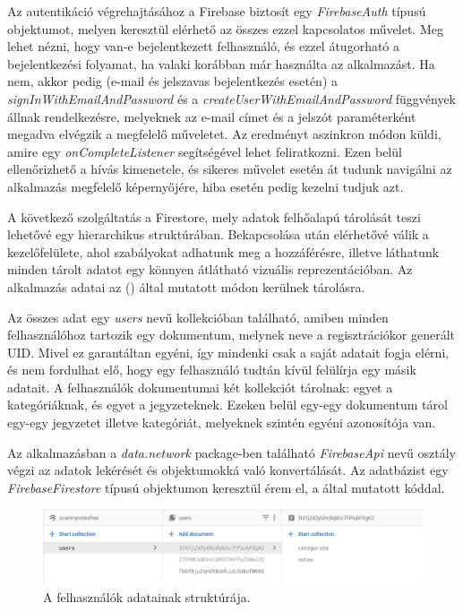 Az autentikáció végrehajtásához a Firebase biztosít egy \emph{FirebaseAuth} típusú objektumot, melyen keresztül elérhető az összes ezzel kapcsolatos művelet. Meg lehet nézni, hogy van-e bejelentkezett felhasználó, és ezzel átugorható a bejelentkezési folyamat, ha valaki korábban már használta az alkalmazást. Ha nem, akkor pedig (e-mail és jelszavas bejelentkezés esetén) a \emph{signInWithEmailAndPassword} és a \emph{createUserWithEmailAndPassword} függvények állnak rendelkezésre, melyeknek az e-mail címet és a jelszót paraméterként megadva elvégzik a megfelelő műveletet. Az eredményt aszinkron módon küldi, amire egy \emph{onCompleteListener} segítségével lehet feliratkozni. Ezen belül ellenőrizhető a hívás kimenetele, és sikeres művelet esetén át tudunk navigálni az alkalmazás megfelelő képernyőjére, hiba esetén pedig kezelni tudjuk azt.

A következő szolgáltatás a Firestore, mely adatok felhőalapú tárolását teszi lehetővé egy hierarchikus struktúrában. Bekapcsolása után elérhetővé válik a kezelőfelülete, ahol szabályokat adhatunk meg a hozzáférésre, illetve láthatunk minden tárolt adatot egy könnyen átlátható vizuális reprezentációban. Az alkalmazás adatai az () által mutatott módon kerülnek tárolásra. 

Az összes adat egy \emph{users} nevű kollekcióban található, amiben minden felhasználóhoz tartozik egy dokumentum, melynek neve a regisztrációkor generált UID. Mivel ez garantáltan egyéni, így mindenki csak a saját adatait fogja elérni, és nem fordulhat elő, hogy egy felhasználó tudtán kívül felülírja egy másik adatait. A felhasználók dokumentumai két kollekciót tárolnak: egyet a kategóriáknak, és egyet a jegyzeteknek. Ezeken belül egy-egy dokumentum tárol egy-egy jegyzetet illetve kategóriát, melyeknek szintén egyéni azonosítója van. 

Az alkalmazásban a \emph{data.network} package-ben található \emph{FirebaseApi} nevű osztály végzi az adatok lekérését és objektumokká való konvertálását. Az adatbázist egy \emph{FirebaseFirestore} típusú objektumon keresztül érem el, a  által mutatott kóddal. 

\begin{figure}[!ht]
	\centering
	\includegraphics[width=150mm, keepaspectratio]{figures/firestore.png}
	\caption{A felhasználók adatainak struktúrája.}
	\label{fig:Firestore}
\end{figure}

